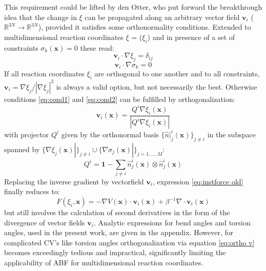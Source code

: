 This requirement could be lifted by den Otter\autocite{den2000thermodynamic}, who put forward the breakthrough idea that the change in $\xi$ can be propagated along an arbitrary vector field $\textbf{v}_i$ ($\mathbb{R}^{3N} \to \mathbb{R}^{3N}$), provided it satisfies some orthonormality conditions.
Extended to multidimensional reaction coordinates \textbf{$\xi$} = ($\xi_i$) and in presence of a set of constraints $\sigma_{k}(\textbf{x})=0$ these read:\autocite{ciccotti2005blue}
\begin{equation}
  \textbf{v}_i \cdot \nabla \xi_j = \delta_{ij} \label{eq:cond1}
\end{equation}
\begin{equation}
  \textbf{v}_i \cdot \nabla \sigma_k = 0 \label{eq:cond2}
\end{equation}
If all reaction coordinates $\xi_i$ are orthogonal to one another and to all constraints, $\textbf{v}_i = \nabla \xi_j/|\nabla \xi_j|^2$ is always a valid option, but not necessarily the best.
Otherwise conditions \ref{eq:cond1} and \ref{eq:cond2} can be fulfilled by orthogonalization:\autocite{ciccotti2005blue}
\begin{equation}
  \textbf{v}_i (\textbf{x}) = \frac{Q^i \nabla \xi_i (\textbf{x})}{|Q^i \nabla \xi_i (\textbf{x})|} \label{eq:ortho v}
\end{equation}
with projector $Q^i$ given by the orthonormal basis $\{\hat{n}|_{j}^{i}(\textbf{x})\}_{j\neq i}$ in the subspace spanned by $\{\nabla \xi_j (\textbf{x})|\}_{j\neq i} \cup \{\nabla\sigma_j (\textbf{x})|\}_{j=1,...,M}$:
\begin{equation}
  Q^i = \textbf{1} - \sum_{j \neq i} \hat{n}_{j}^{i}(\textbf{x}) \otimes \hat{n}_{j}^{i}(\textbf{x})
\end{equation}
Replacing the inverse gradient by vectorfield $\textbf{v}_i$, expression \ref{eq:instforce old} finally reduces to:
\begin{equation}
  F(\xi_i,\textbf{x}) = -\nabla V(\textbf{x}) \cdot \textbf{v}_i(\textbf{x}) + \beta^{-1} \nabla \cdot \textbf{v}_i(\textbf{x}) \label{eq:inst ABF force}
\end{equation}
but still involves the calculation of second derivatives in the form of the divergence of vector fields $\textbf{v}_i$.\autocite{comer2015adaptive} Analytic expressions for bend angles and torsion angles, used in the present work, are given in the appendix. However, for complicated CV's like torsion angles orthogonalization via equation \ref{eq:ortho v} becomes exceedingly tedious and impractical, significantly limiting the applicability of ABF for multidimensional reaction coordinates.

